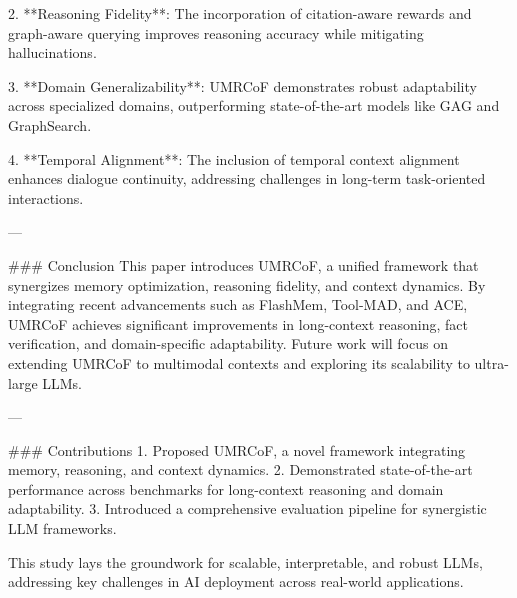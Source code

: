 2. **Reasoning Fidelity**:  
   The incorporation of citation-aware rewards and graph-aware querying improves reasoning accuracy while mitigating hallucinations.

3. **Domain Generalizability**:  
   UMRCoF demonstrates robust adaptability across specialized domains, outperforming state-of-the-art models like GAG and GraphSearch.

4. **Temporal Alignment**:  
   The inclusion of temporal context alignment enhances dialogue continuity, addressing challenges in long-term task-oriented interactions.

---

### Conclusion  
This paper introduces UMRCoF, a unified framework that synergizes memory optimization, reasoning fidelity, and context dynamics. By integrating recent advancements such as FlashMem, Tool-MAD, and ACE, UMRCoF achieves significant improvements in long-context reasoning, fact verification, and domain-specific adaptability. Future work will focus on extending UMRCoF to multimodal contexts and exploring its scalability to ultra-large LLMs.

---

### Contributions  
1. Proposed UMRCoF, a novel framework integrating memory, reasoning, and context dynamics.  
2. Demonstrated state-of-the-art performance across benchmarks for long-context reasoning and domain adaptability.  
3. Introduced a comprehensive evaluation pipeline for synergistic LLM frameworks.  

This study lays the groundwork for scalable, interpretable, and robust LLMs, addressing key challenges in AI deployment across real-world applications.